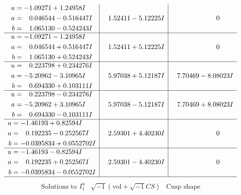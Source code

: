 \documentclass[1p]{elsarticle_modified}
\theoremstyle{definition}
\newcommand{\I}{\sqrt{-1}}
\begin{document}
$$\begin{array}{c|c|c}
\begin{aligned}
u &= -1.09271 + 1.24958 I \\
a &= \phantom{-}0.046544 - 0.516447 I \\
b &= \phantom{-}1.065130 - 0.524243 I\end{aligned}
 & \phantom{-}1.52411 - 5.12225 I & \phantom{-0.000000 } 0 \\ \hline\begin{aligned}
u &= -1.09271 - 1.24958 I \\
a &= \phantom{-}0.046544 + 0.516447 I \\
b &= \phantom{-}1.065130 + 0.524243 I\end{aligned}
 & \phantom{-}1.52411 + 5.12225 I & \phantom{-0.000000 } 0 \\ \hline\begin{aligned}
u &= \phantom{-}0.223798 + 0.234276 I \\
a &= -5.20962 - 3.10965 I \\
b &= \phantom{-}0.694330 + 0.103111 I\end{aligned}
 & \phantom{-}5.97038 + 5.12187 I & \phantom{-}7.70469 - 8.08023 I \\ \hline\begin{aligned}
u &= \phantom{-}0.223798 - 0.234276 I \\
a &= -5.20962 + 3.10965 I \\
b &= \phantom{-}0.694330 - 0.103111 I\end{aligned}
 & \phantom{-}5.97038 - 5.12187 I & \phantom{-}7.70469 + 8.08023 I \\ \hline\begin{aligned}
u &= -1.46193 + 0.82594 I \\
a &= \phantom{-}0.192235 - 0.252567 I \\
b &= -0.0395834 + 0.0552702 I\end{aligned}
 & \phantom{-}2.59301 + 4.40230 I & \phantom{-0.000000 } 0 \\ \hline\begin{aligned}
u &= -1.46193 - 0.82594 I \\
a &= \phantom{-}0.192235 + 0.252567 I \\
b &= -0.0395834 - 0.0552702 I\end{aligned}
 & \phantom{-}2.59301 - 4.40230 I & \phantom{-0.000000 } 0\\
 \hline 
 \end{array}$$\newpage$$\begin{array}{c|c|c}  
\text{Solutions to }I^u_{1}& \I (\text{vol} + \sqrt{-1}CS) & \text{Cusp shape}\\

\end{array}$$
\end{document}
